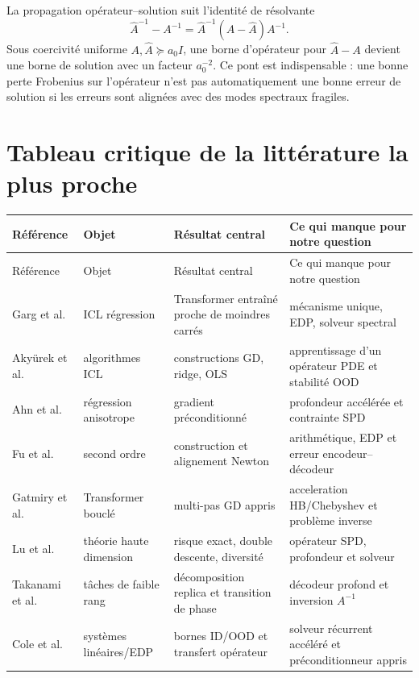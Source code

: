 \documentclass[11pt,a4paper]{article}
\begin{document}
La propagation opérateur--solution suit l'identité de résolvante
\[
 \widehat A^{-1}-A^{-1}
 =\widehat A^{-1}(A-\widehat A)A^{-1}.
\]
Sous coercivité uniforme $A,\widehat A\succeq a_0I$, une borne d'opérateur pour
$\widehat A-A$ devient une borne de solution avec un facteur $a_0^{-2}$. Ce
pont est indispensable : une bonne perte Frobenius sur l'opérateur n'est pas
automatiquement une bonne erreur de solution si les erreurs sont alignées avec
des modes spectraux fragiles.

\section{Tableau critique de la littérature la plus proche}

\begin{longtable}{p{}p{}p{}p{}}
\toprule
Référence & Objet & Résultat central & Ce qui manque pour notre question \\
\midrule
\endfirsthead
\toprule
Référence & Objet & Résultat central & Ce qui manque pour notre question \\
\midrule
\endhead
Garg et al. \cite{garg2022} & ICL régression & Transformer entraîné proche de
moindres carrés & mécanisme unique, EDP, solveur spectral \\
Akyürek et al. \cite{akyurek2023} & algorithmes ICL & constructions GD, ridge,
OLS & apprentissage d'un opérateur PDE et stabilité OOD \\
Ahn et al. \cite{ahn2023preconditioned} & régression anisotrope & gradient
préconditionné & profondeur accélérée et contrainte SPD \\
Fu et al. \cite{fu2024secondorder} & second ordre & construction et alignement
Newton & arithmétique, EDP et erreur encodeur--décodeur \\
Gatmiry et al. \cite{gatmiry2024learn} & Transformer bouclé & multi-pas GD
appris & acceleration HB/Chebyshev et problème inverse \\
Lu et al. \cite{lu2025asymptotic} & théorie haute dimension & risque exact,
double descente, diversité & opérateur SPD, profondeur et solveur \\
Takanami et al. \cite{takanami2026} & tâches de faible rang & décomposition
replica et transition de phase & décodeur profond et inversion $A^{-1}$ \\
Cole et al. \cite{cole2025systems} & systèmes linéaires/EDP & bornes ID/OOD et
transfert opérateur & solveur récurrent accéléré et préconditionneur appris \\

\end{longtable}
\end{document}
